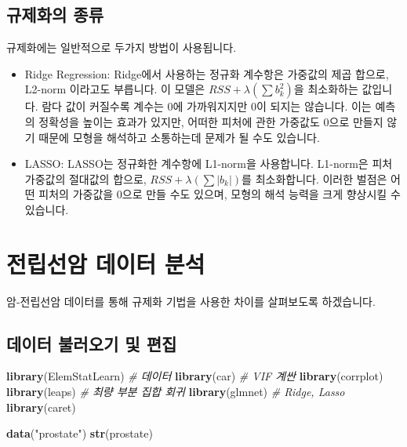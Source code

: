 \documentclass[12pt,]{book}
\newenvironment{Shaded}{\begin{snugshade}}{\end{snugshade}}
\newcommand{\CommentTok}[1]{\textcolor[rgb]{0.56,0.35,0.01}{\textit{#1}}}
\newcommand{\KeywordTok}[1]{\textcolor[rgb]{0.13,0.29,0.53}{\textbf{#1}}}
\newcommand{\NormalTok}[1]{#1}
\newcommand{\StringTok}[1]{\textcolor[rgb]{0.31,0.60,0.02}{#1}}
\begin{document}
\hypertarget{uxaddcuxc81cuxd654uxc758-uxc885uxb958}{%
\subsection{규제화의 종류}\label{uxaddcuxc81cuxd654uxc758-uxc885uxb958}}

규제화에는 일반적으로 두가지 방법이 사용됩니다.

\begin{itemize}
\item
  Ridge Regression: Ridge에서 사용하는 정규화 계수항은 가중값의 제곱 합으로, L2-norm 이라고도 부릅니다. 이 모델은 \(RSS + \lambda(\sum b_k^2)\)을 최소화하는 값입니다. 람다 값이 커질수록 계수는 0에 가까워지지만 0이 되지는 않습니다. 이는 예측의 정확성을 높이는 효과가 있지만, 어떠한 피처에 관한 가중값도 0으로 만들지 않기 때문에 모형을 해석하고 소통하는데 문제가 될 수도 있습니다.
\item
  LASSO: LASSO는 정규화한 계수항에 L1-norm을 사용합니다. L1-norm은 피처 가중값의 절대값의 합으로, \(RSS + \lambda(\sum |b_k|)\)를 최소화합니다. 이러한 벌점은 어떤 피처의 가중값을 0으로 만들 수도 있으며, 모형의 해석 능력을 크게 향상시킬 수 있습니다.
\end{itemize}

\hypertarget{uxc804uxb9bduxc120uxc554-uxb370uxc774uxd130-uxbd84uxc11d}{%
\section{전립선암 데이터 분석}\label{uxc804uxb9bduxc120uxc554-uxb370uxc774uxd130-uxbd84uxc11d}}

암-전립선암 데이터를 통해 규제화 기법을 사용한 차이를 살펴보도록 하겠습니다.

\hypertarget{uxb370uxc774uxd130-uxbd88uxb7ecuxc624uxae30-uxbc0f-uxd3b8uxc9d1-1}{%
\subsection{데이터 불러오기 및 편집}\label{uxb370uxc774uxd130-uxbd88uxb7ecuxc624uxae30-uxbc0f-uxd3b8uxc9d1-1}}

\begin{Shaded}
\begin{Highlighting}[]
\KeywordTok{library}\NormalTok{(ElemStatLearn) }\CommentTok{# 데이터}
\KeywordTok{library}\NormalTok{(car) }\CommentTok{# VIF 계싼}
\KeywordTok{library}\NormalTok{(corrplot)}
\KeywordTok{library}\NormalTok{(leaps) }\CommentTok{# 최량 부분 집합 회귀}
\KeywordTok{library}\NormalTok{(glmnet) }\CommentTok{# Ridge, Lasso}
\KeywordTok{library}\NormalTok{(caret)}

\KeywordTok{data}\NormalTok{(}\StringTok{"prostate"}\NormalTok{)}
\KeywordTok{str}\NormalTok{(prostate)}
\end{Highlighting}
\end{Shaded}
\end{document}
